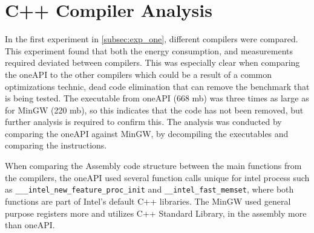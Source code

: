 \section{C++ Compiler Analysis}\label{app:compiler-analysis}

In the first experiment in \cref{subsec:exp_one}, different compilers were compared. This experiment found that both the energy consumption, and measurements required deviated between compilers. This was especially clear when comparing the oneAPI to the other compilers which could be a result of a common optimizations technic, dead code elimination that can remove the benchmark that is being tested\cite{sestoft2013microbenchmarks}. The executable from oneAPI (668 mb) was three times as large as for MinGW (220 mb), so this indicates that the code has not been removed, but further analysis is required to confirm this. The analysis was conducted by comparing the oneAPI against MinGW, by decompiling the executables and comparing the instructions.

When comparing the Assembly code structure between the main functions from the compilers, the oneAPI used several function calls unique for intel process such as \texttt{\_\_\_intel\_new\_feature\_proc\_init} and \texttt{\_\_intel\_fast\_memset}, where both functions are part of Intel's default C++ libraries\cite{Intelassembly}. The MinGW used general purpose registers more and utilizes C++ Standard Library, in the assembly more than oneAPI.






